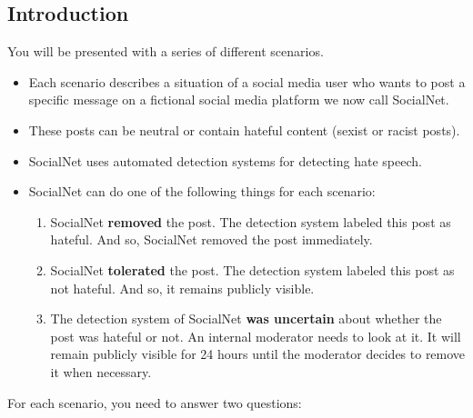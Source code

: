 \documentclass[a4paper]{article}
\begin{document}
\subsection{Introduction}
You will be presented with a series of different scenarios.
\begin{itemize}
    \item Each scenario describes a situation of a social media user who wants to post a specific message on a fictional social media platform we now call SocialNet.
    \item These posts can be neutral or contain hateful content (sexist or racist posts).
    \item SocialNet uses automated detection systems for detecting hate speech.
    \item SocialNet can do one of the following things for each scenario:
          \begin{enumerate}
              \item SocialNet \textbf{removed} the post. The detection system labeled this post as hateful. And so, SocialNet removed the post immediately.
              \item SocialNet \textbf{tolerated} the post. The detection system labeled this post as not hateful. And so, it remains publicly visible.
              \item The detection system of SocialNet \textbf{was uncertain} about whether the post was hateful or not. An internal moderator needs to look at it. It will remain publicly visible for 24 hours until the moderator decides to remove it when necessary.
          \end{enumerate}
\end{itemize}

For each scenario, you need to answer two questions:
\end{document}
